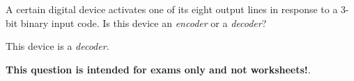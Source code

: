 

A certain digital device activates one of its eight output lines in response to a 3-bit binary input code.  Is this device an {\it encoder} or a {\it decoder}?







This device is a {\it decoder}.







{\bf This question is intended for exams only and not worksheets!}.




